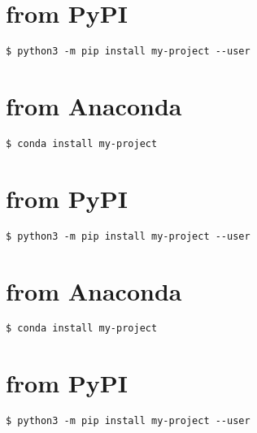 \documentclass[letterpaper,10pt,english]{sphinxmanual}
\begin{document}
\chapter{from PyPI}
\label{\detokenize{installation:installation-9-from_PyPI}}\label{\detokenize{installation:installation-9}}
\begin{Verbatim}[commandchars=\\\{\}]
$ python3 -m pip install my-project --user
\end{Verbatim}


\chapter{from Anaconda}
\label{\detokenize{installation:installation-9-from_Anaconda}}
\begin{Verbatim}[commandchars=\\\{\}]
$ conda install my-project
\end{Verbatim}


\chapter{from PyPI}
\label{\detokenize{installation:installation-10-from_PyPI}}\label{\detokenize{installation:installation-10}}
\begin{Verbatim}[commandchars=\\\{\}]
$ python3 -m pip install my-project --user
\end{Verbatim}


\chapter{from Anaconda}
\label{\detokenize{installation:installation-10-from_Anaconda}}
\begin{Verbatim}[commandchars=\\\{\}]
$ conda install my-project
\end{Verbatim}


\chapter{from PyPI}
\label{\detokenize{installation:installation-11-from_PyPI}}\label{\detokenize{installation:installation-11}}
\begin{Verbatim}[commandchars=\\\{\}]
$ python3 -m pip install my-project --user
\end{Verbatim}
\end{document}
